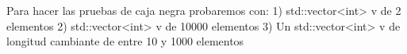 Para hacer las pruebas de caja negra probaremos con:
1) std::vector<int> v de 2 elementos
2) std::vector<int> v de 10000 elementos
3) Un std::vector<int> v de longitud cambiante de entre 10 y 1000 elementos 
